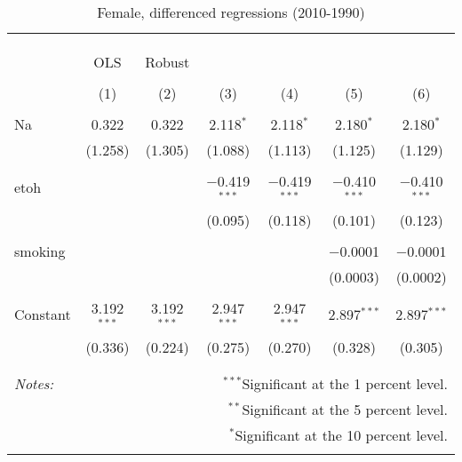 \documentclass[11pt]{article}\usepackage[]{graphicx}\usepackage[]{color}
\begin{document}
\begin{table}[!htbp] \centering 
  \caption{Female, differenced regressions (2010-1990)} 
  \label{tab:flm} 
\begin{tabular}{@{\extracolsep{5pt}}lcccccc} 
\\[-1.8ex]\hline 
\hline \\[-1.8ex] 
\\[-1.8ex] & \multicolumn{6}{c}{ } \\ 
 & OLS & Robust &  &  &  &  \\ 
\\[-1.8ex] & (1) & (2) & (3) & (4) & (5) & (6)\\ 
\hline \\[-1.8ex] 
 Na & 0.322 & 0.322 & 2.118$^{*}$ & 2.118$^{*}$ & 2.180$^{*}$ & 2.180$^{*}$ \\ 
  & (1.258) & (1.305) & (1.088) & (1.113) & (1.125) & (1.129) \\ 
  & & & & & & \\ 
 etoh &  &  & $-$0.419$^{***}$ & $-$0.419$^{***}$ & $-$0.410$^{***}$ & $-$0.410$^{***}$ \\ 
  &  &  & (0.095) & (0.118) & (0.101) & (0.123) \\ 
  & & & & & & \\ 
 smoking &  &  &  &  & $-$0.0001 & $-$0.0001 \\ 
  &  &  &  &  & (0.0003) & (0.0002) \\ 
  & & & & & & \\ 
 Constant & 3.192$^{***}$ & 3.192$^{***}$ & 2.947$^{***}$ & 2.947$^{***}$ & 2.897$^{***}$ & 2.897$^{***}$ \\ 
  & (0.336) & (0.224) & (0.275) & (0.270) & (0.328) & (0.305) \\ 
  & & & & & & \\ 
\hline 
\hline \\[-1.8ex] 
\textit{Notes:} & \multicolumn{6}{r}{$^{***}$Significant at the 1 percent level.} \\ 
 & \multicolumn{6}{r}{$^{**}$Significant at the 5 percent level.} \\ 
 & \multicolumn{6}{r}{$^{*}$Significant at the 10 percent level.} \\ 
 & \multicolumn{6}{r}{} \\ 
\end{tabular} 
\end{table} 
\end{document}
